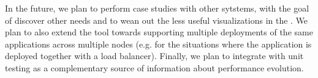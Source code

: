 \documentclass{sig-alternate-05-2015}
\begin{document}
In the future, we plan to perform case studies with other sytstems, with the goal of discover other needs and to wean out the less useful visualizations in the \tool. We plan to also extend the tool towards supporting multiple deployments of the same applications across multiple nodes (e.g. for the situations where the application is deployed together with a load balancer). Finally, we plan to integrate \tool with unit testing as a complementary source of information about performance evolution.







\end{document}
